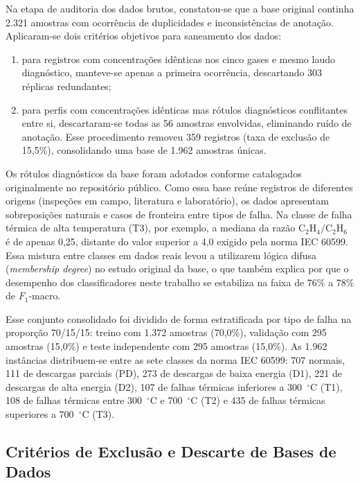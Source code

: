 Na etapa de auditoria dos dados brutos, constatou-se que a base original continha 2.321 amostras com ocorrência de duplicidades e inconsistências de anotação. Aplicaram-se dois critérios objetivos para saneamento dos dados: 

\begin{enumerate}         
    \item para registros com concentrações idênticas nos cinco gases e mesmo laudo diagnóstico, manteve-se apenas a primeira ocorrência, descartando 303 réplicas redundantes;
    \item para perfis com concentrações idênticas mas rótulos diagnósticos conflitantes entre si, descartaram-se todas as 56 amostras envolvidas, eliminando ruído de anotação. Esse procedimento removeu 359 registros (taxa de exclusão de 15,5\%), consolidando uma base de 1.962 amostras únicas.
\end{enumerate}

Os rótulos diagnósticos da base foram adotados conforme catalogados originalmente no repositório público. Como essa base reúne registros de diferentes origens (inspeções em campo, literatura e laboratório), os dados apresentam sobreposições naturais e casos de fronteira entre tipos de falha. Na classe de falha térmica de alta temperatura (T3), por exemplo, a mediana da razão $\text{C}_2\text{H}_4/\text{C}_2\text{H}_6$ é de apenas 0,25, distante do valor superior a 4,0 exigido pela norma IEC 60599. Essa mistura entre classes em dados reais levou  a utilizarem lógica difusa (\textit{membership degree}) no estudo original da base, o que também explica por que o desempenho dos classificadores neste trabalho se estabiliza na faixa de 76\% a 78\% de $F_1$-macro.

Esse conjunto consolidado foi dividido de forma estratificada por tipo de falha na proporção 70/15/15: treino com 1.372 amostras (70,0\%), validação com 295 amostras (15,0\%) e teste independente com 295 amostras (15,0\%). As 1.962 instâncias distribuem-se entre as sete classes da norma IEC 60599: 707 normais, 111 de descargas parciais (PD), 273 de descargas de baixa energia (D1), 221 de descargas de alta energia (D2), 107 de falhas térmicas inferiores a 300~$^\circ\text{C}$ (T1), 108 de falhas térmicas entre 300~$^\circ\text{C}$ e 700~$^\circ\text{C}$ (T2) e 435 de falhas térmicas superiores a 700~$^\circ\text{C}$ (T3).

\subsection{Critérios de Exclusão e Descarte de Bases de Dados}

